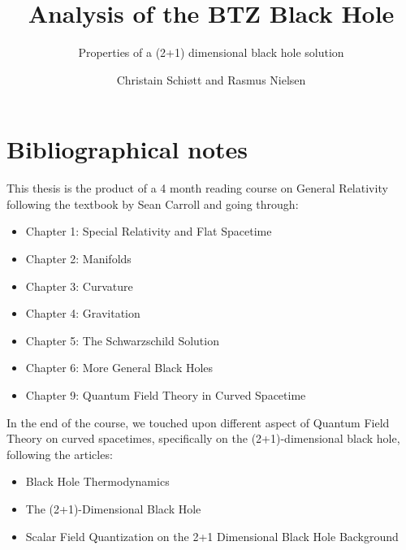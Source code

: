 \documentclass[a4paper,12pt]{article}
\author{Christain Schiøtt and Rasmus Nielsen}
\title{Analysis of the BTZ Black Hole}
\subtitle{Properties of a (2+1) dimensional black hole solution}
\institute{Niels Bohr Institutet}
\theoremstyle{definition}
\theoremstyle{theorem}
\numberwithin{equation}{section}
\begin{document}
\maketitle



\newpage

\tableofcontents
\thispagestyle{empty}
\setcounter{page}{0}

\newpage
\pagestyle{plain}











\section*{Bibliographical notes}
This thesis is the product of a 4 month reading course on General Relativity following the textbook by Sean Carroll \cite{GR} and going through:
\begin{itemize}
\item Chapter 1: Special Relativity and Flat Spacetime
\item Chapter 2: Manifolds
\item Chapter 3: Curvature
\item Chapter 4: Gravitation
\item Chapter 5: The Schwarzschild Solution
\item Chapter 6: More General Black Holes 
\item Chapter 9: Quantum Field Theory in Curved Spacetime
\end{itemize}
In the end of the course, we touched upon different aspect of Quantum Field Theory on curved spacetimes, specifically on the (2+1)-dimensional black hole, following the articles:
\begin{itemize}
\item Black Hole Thermodynamics \cite{BH thermo}
\item The (2+1)-Dimensional Black Hole \cite{2+1 black hole}
\item Scalar Field Quantization on the 2+1 Dimensional Black Hole Background \cite{Green}
\end{itemize}
\end{document}
